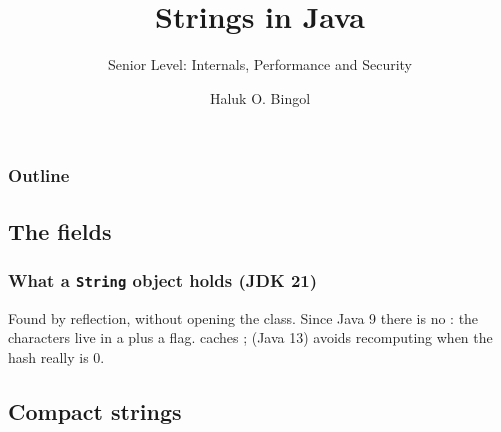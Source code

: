 \documentclass[aspectratio=169,10pt,compress]{beamer}
\title{Strings in Java}
\subtitle{Senior Level: Internals, Performance and Security}
\author[Bingol]{Haluk O. Bingol}
\institute[FCIS]{
    Faculty of Computer and Information Sciences\\
    Yeditepe University
}
\date{
	{\tiny \hbTimeStamp}
}
\begin{document}
\begin{frame}[t,fragile]
  \titlepage
\end{frame}




\begin{frame}[t,fragile] \frametitle{Outline}
  \tableofcontents[hideallsubsections]
\end{frame}


\subsection[Fields]{The fields}




\begin{frame}[t,fragile] \frametitle{What a \texttt{String} object holds (JDK 21)}

  \vspace{0.3em}
  \small Found by reflection, without opening the class. Since Java 9 there is no : the characters live in a
   plus a  flag. 
   caches ; 
   (Java 13) avoids
  recomputing when the hash really is 0.
\end{frame}




\subsection[Compact]{Compact strings}
\end{document}
